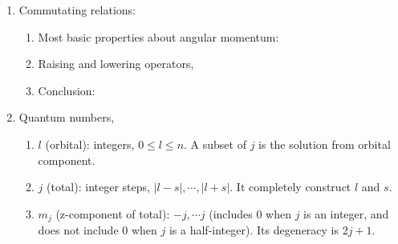 \documentclass{school-22.101-notes}
\begin{document}
\begin{enumerate}
\item Commutating relations: 
  \begin{enumerate}
  \item Most basic properties about angular momentum:
  \item Raising and lowering operators, 
  \item Conclusion: 
  \end{enumerate}

\item Quantum numbers, 
  \begin{enumerate}
  \item $l$ (orbital): integers, $0 \le l \le n$. A subset of $j$ is the solution from orbital component. 
  \item $j$ (total): integer steps, $|l-s|, \cdots, |l+s|$. It completely construct $l$ and $s$. 
  \item $m_j$ (z-component of total): $-j, \cdots j$ (includes 0 when $j$ is an integer, and does not include 0 when $j$ is a half-integer). Its degeneracy is $2j+1$. 
  \end{enumerate}
\end{enumerate}
\end{document}
